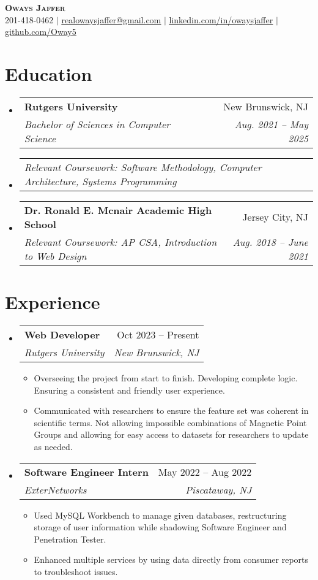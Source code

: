 \documentclass[letterpaper,12pt]{article}
\makeatletter
\newcommand{\resumeItem}[1]{
  \item\small{
    {#1 \vspace{-2pt}}
  }
}
\newcommand{\resumeSubheading}[4]{
  \vspace{-2pt}\item
    \begin{tabular*}{0.97\textwidth}[t]{l@{\extracolsep{\fill}}r}
      \textbf{#1} & #2 \\
      \textit{\small#3} & \textit{\small #4} \\
    \end{tabular*}\vspace{-7pt}
}
\newcommand{\resumeSubheadingCoursework}[1]{
  \item
    \begin{tabular*}{0.97\textwidth}{l@{\extracolsep{\fill}}r}
      \textit{\small#1} \\
    \end{tabular*}\vspace{-7pt}
}
\newcommand{\resumeSubHeadingListStart}{\begin{itemize}[leftmargin=0.15in, label={}]}
\newcommand{\resumeSubHeadingListEnd}{\end{itemize}}
\newcommand{\resumeItemListStart}{\begin{itemize}}
\newcommand{\resumeItemListEnd}{\end{itemize}\vspace{-5pt}}
\makeatother
\begin{document}
\begin{center}
    \textbf{ \scshape Oways Jaffer} \\ \vspace{1pt}
    \small 201-418-0462 $|$ \href{mailto:realowaysjaffer@gmail.com}{\underline{realowaysjaffer@gmail.com}} $|$ 
    \href{https://linkedin.com/in/oways}{\underline{linkedin.com/in/owaysjaffer}} $|$
    \href{https://github.com/oway5}{\underline{github.com/Oway5}}
\end{center}


\section{Education}
  \resumeSubHeadingListStart
    \resumeSubheading
      {Rutgers University}{New Brunswick, NJ}
      {Bachelor of Sciences in Computer Science}{Aug. 2021 -- May 2025}
      \resumeSubheadingCoursework
      {Relevant Coursework: Software Methodology, Computer Architecture, Systems Programming}
      \resumeSubheading
      {Dr. Ronald E. Mcnair Academic High School}{Jersey City, NJ}
      {Relevant Coursework: AP CSA, Introduction to Web Design}{Aug. 2018 -- June 2021}
    
  \resumeSubHeadingListEnd


\section{Experience}
  \resumeSubHeadingListStart

    \resumeSubheading
      {Web Developer}{Oct 2023 -- Present}
      {Rutgers University}{New Brunswick, NJ}
      \resumeItemListStart
        \resumeItem{Overseeing the project from start to finish. Developing complete logic. Ensuring a consistent and friendly user experience.}
        \resumeItem{Communicated with researchers to ensure the feature set was coherent in scientific terms. Not allowing impossible combinations of Magnetic Point Groups and allowing for easy access to datasets for researchers to update as needed.}
      \resumeItemListEnd
      \resumeSubheading
      {Software Engineer Intern}{May 2022 -- Aug 2022}
      {ExterNetworks}{Piscataway, NJ}
      \resumeItemListStart
        \resumeItem{Used MySQL Workbench to manage given databases, restructuring storage of user information while shadowing Software Engineer and Penetration Tester.}
        \resumeItem{Enhanced multiple services by using data directly from consumer reports to troubleshoot issues.}
      \resumeItemListEnd
  \resumeSubHeadingListEnd
\end{document}
